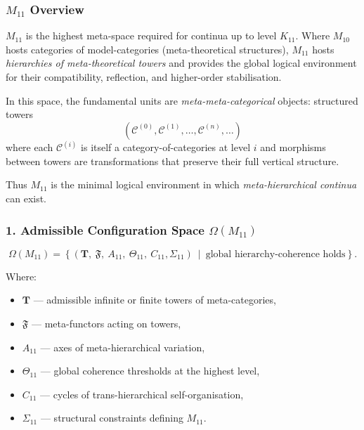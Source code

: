 

\subsubsection{$M_{11}$ Overview}
\label{sec:m11-overview}

$M_{11}$ is the highest meta-space required for continua up to level $K_{11}$.  
Where $M_{10}$ hosts categories of model-categories (meta-theoretical structures),  
$M_{11}$ hosts \emph{hierarchies of meta-theoretical towers} and provides  
the global logical environment for their compatibility, reflection,  
and higher-order stabilisation.

In this space, the fundamental units are \emph{meta-meta-categorical} objects:
structured towers
\[
(\mathcal{C}^{(0)}, \mathcal{C}^{(1)}, \ldots, \mathcal{C}^{(n)}, \ldots)
\]
where each $\mathcal{C}^{(i)}$ is itself a category-of-categories at level $i$
and morphisms between towers are transformations that preserve their full  
vertical structure.

Thus $M_{11}$ is the minimal logical environment in which  
\emph{meta-hierarchical continua} can exist.

\subsubsection*{1. Admissible Configuration Space $\Omega(M_{11})$}

\[
\Omega(M_{11}) =
\left\{
\left( \mathbf{T},\ \mathfrak{F},\ A_{11},\
\Theta_{11},\ C_{11},\Sigma_{11} \right)
\ \middle|\ 
\text{global hierarchy-coherence holds}
\right\}.
\]

Where:

\begin{itemize}
    \item $\mathbf{T}$ — admissible infinite or finite towers of meta-categories,
    \item $\mathfrak{F}$ — meta-functors acting on towers,
    \item $A_{11}$ — axes of meta-hierarchical variation,
    \item $\Theta_{11}$ — global coherence thresholds at the highest level,
    \item $C_{11}$ — cycles of trans-hierarchical self-organisation,
    \item $\Sigma_{11}$ — structural constraints defining $M_{11}$.
\end{itemize}

